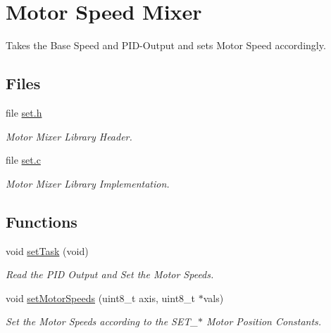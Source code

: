\hypertarget{group__set}{\section{Motor Speed Mixer}
\label{group__set}
}


Takes the Base Speed and P\-I\-D-\/\-Output and sets Motor Speed accordingly.  


\subsection*{Files}
\begin{DoxyCompactItemize}
\item 
file \hyperlink{set_8h}{set.\-h}
\begin{DoxyCompactList}\small\item\em Motor Mixer Library Header. \end{DoxyCompactList}\item 
file \hyperlink{set_8c}{set.\-c}
\begin{DoxyCompactList}\small\item\em Motor Mixer Library Implementation. \end{DoxyCompactList}\end{DoxyCompactItemize}
\subsection*{Functions}
\begin{DoxyCompactItemize}
\item 
void \hyperlink{group__set_ga37f245c493d725009017f62a78505e64}{set\-Task} (void)
\begin{DoxyCompactList}\small\item\em Read the P\-I\-D Output and Set the Motor Speeds. \end{DoxyCompactList}\item 
void \hyperlink{group__set_ga4173baf06c19647e0c60ef2e910bbc87}{set\-Motor\-Speeds} (uint8\-\_\-t axis, uint8\-\_\-t $\ast$vals)
\begin{DoxyCompactList}\small\item\em Set the Motor Speeds according to the S\-E\-T\-\_\-$\ast$ Motor Position Constants. \end{DoxyCompactList}\end{DoxyCompactItemize}

